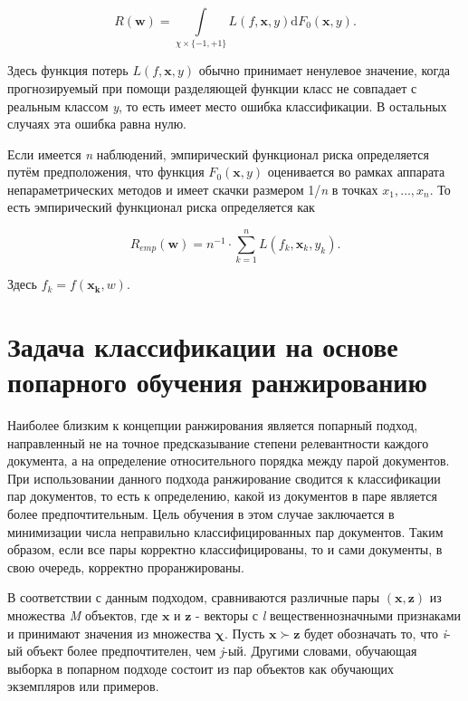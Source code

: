 \documentclass[12pt,a4paper,oneside]{article}
\begin{document}
\[
R(\mathbf{w}) = \int \limits_{\chi \times \{-1, +1\}} L(f, \mathbf{x}, y) \mathrm{d} F_0(\mathbf{x}, y).
\]

Здесь функция потерь \(L(f, \mathbf{x}, y)\) обычно принимает ненулевое значение, когда прогнозируемый при помощи разделяющей функции класс не совпадает с реальным классом \emph{y}, то есть имеет место ошибка классификации. 
В остальных случаях эта ошибка равна нулю. 

\par
Если имеется \emph{n} наблюдений, эмпирический функционал риска определяется путём предположения, что функция \(F_0(\mathbf{x}, y)\) оценивается во рамках аппарата непараметрических методов  и имеет скачки размером 1/\emph{n} в точках \(x_1, \dots, x_n\). 
То есть эмпирический функционал риска определяется как

\[
R_{emp}(\mathbf{w}) = n^{-1} \cdot \sum \limits_{k=1}^n L(f_k, \mathbf{x}_k, y_k).
\]

Здесь \(f_k=f(\mathbf{x_k}, w)\). 


\section{Задача классификации на основе попарного обучения ранжированию}
\label{sec:pairwise_rank_learning_problem}

\par
Наиболее близким к концепции ранжирования является попарный подход, направленный не на точное предсказывание степени релевантности каждого документа, а на определение относительного порядка между парой документов. 
При использовании данного подхода ранжирование сводится к классификации пар документов, то есть к определению, какой из документов в паре является более предпочтительным.
Цель обучения в этом случае заключается в минимизации числа неправильно классифицированных пар документов. 
Таким образом, если все пары корректно классифицированы, то и сами документы, в свою очередь, корректно проранжированы. 

\par
В соответствии с данным подходом, сравниваются различные пары \((\mathbf{x},\mathbf{z})\) из множества \emph{M} объектов, где \(\mathbf{x}\) и \(\mathbf{z}\) - векторы с \emph{l} вещественнозначными признаками и принимают значения из множества \(\mathbf{\chi}\). 
Пусть \(\mathbf{x} \succ \mathbf{z}\) будет обозначать то, что \emph{i}-ый объект более предпочтителен, чем \emph{j}-ый. 
Другими словами, обучающая выборка в попарном подходе состоит из пар объектов как обучающих экземпляров или примеров. 
\end{document}
